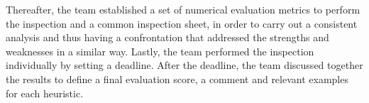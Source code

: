Thereafter, the team established a set of numerical evaluation metrics to perform the inspection and a common inspection sheet, in order to carry out a consistent analysis and thus having a confrontation that addressed the strengths and weaknesses in a similar way.
Lastly, the team performed the inspection individually by setting a deadline. After the deadline, the team discussed together the results to define a final evaluation score, a comment and relevant examples for each heuristic.
\clearpage